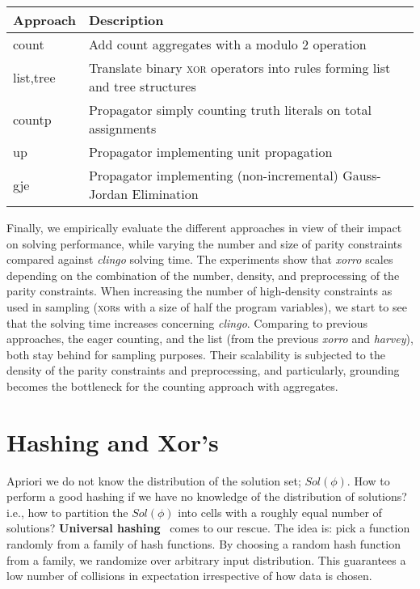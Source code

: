 \documentclass{article}
\newcommand{\XOR}{\textsc{xor}} %
\newcommand{\sysfont}{\textit}
\newcommand{\clingo}{\sysfont{clingo}}
\newcommand{\xorro}{\sysfont{xorro}}
\begin{document}
\begin{table*}[t]
	\caption{\xorro{} approaches to handle parity constraints}\label{table:xorro_approaches}
	\begin{tabular}{ l|l }
		Approach  & Description  \\
		\hline\hline
		count     & Add count aggregates with a modulo 2 operation  \\  
		list,tree & Translate binary \XOR{} operators into rules forming list and tree structures \\
		countp    & Propagator simply counting truth literals on total assignments\\
		up        & Propagator implementing unit propagation\\
		gje       & Propagator implementing (non-incremental) Gauss-Jordan Elimination
		
	\end{tabular}
\end{table*}
%
Finally, we empirically evaluate the different approaches in view of their impact on solving performance,
while varying the number and size of parity constraints compared against \clingo{} solving time.
%
The experiments show that \xorro{} scales depending on the combination of the number, density, and preprocessing of the parity constraints.
%
When increasing the number of high-density constraints as used in sampling (\XOR{}s with a size of half the program variables), we start to see that the solving time increases concerning \clingo.
%
Comparing to previous approaches, the eager counting, and the list (from the previous \xorro{} and \emph{harvey}), both stay behind for sampling purposes. Their scalability is subjected to the density of the parity constraints and preprocessing, and particularly, grounding becomes the bottleneck for the counting approach with aggregates.

\section{Hashing and Xor's} \label{sec:hashing}
Apriori we do not know the distribution of the solution set; $Sol(\phi)$. 
%
How to perform a good hashing if we have no knowledge of the distribution of solutions? i.e., how to partition the $Sol(\phi)$ into cells with a roughly equal number of solutions?
%
\textbf{Universal hashing}~\cite{DBLP:conf/stoc/CarterW77} comes to our rescue. 
%
The idea is: pick a function randomly from a family of hash functions.  By choosing a random hash function from a family, we randomize over arbitrary input distribution. This guarantees a low number of collisions in expectation irrespective of how data is chosen.
%
\end{document}
